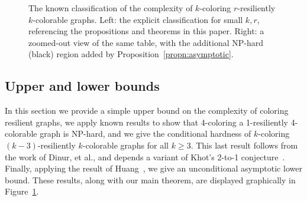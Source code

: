 \documentclass[10pt]{article}
\begin{document}
\begin{figure}
\centering
\begin{subfigure}{.65\textwidth}
  \centering
\end{subfigure}%
\begin{subfigure}{.35\textwidth}
  \centering
\end{subfigure}
\caption{The known classification of the complexity of $k$-coloring
$r$-resiliently $k$-colorable graphs. Left: the explicit classification for
small $k, r$, referencing the propositions and theorems in this paper. Right: a
zoomed-out view of the same table, with the additional NP-hard (black) region
added by Proposition~\ref{propn:asymptotic}.} 
\label{fig:classification} 
\end{figure}

\subsection{Upper and lower bounds} \label{sec:easy-bounds}
In this section we provide a simple upper bound on the complexity of coloring
resilient graphs, we apply known results to show that 4-coloring a
1-resiliently 4-colorable graph is NP-hard, and we give the conditional hardness
of $k$-coloring $(k-3)$-resiliently $k$-colorable graphs for all $k \geq 3$.
This last result follows from the work of Dinur, et al., and depends a variant
of Khot's 2-to-1 conjecture~\cite{DMR06}. Finally, applying the result of
Huang~\cite{Huang13}, we give an unconditional asymptotic lower bound. These
results, along with our main theorem, are displayed graphically in
Figure~\ref{fig:classification}.
\end{document}
